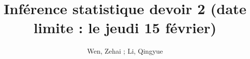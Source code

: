 \documentclass[12pt]{report}
\title{Inférence statistique devoir 2 (date limite : le jeudi 15 février)}
\author{ Wen, Zehai ; Li, Qingyue}
\date{\DTMnow}
\theoremstyle{plain}
\theoremstyle{definition}
\begin{document}
\begin{CJK*}{UTF8}{gbsn}
\maketitle 

\setcounter{tocdepth}{0}
\setcounter{page}{1}





\end{CJK*}
\end{document}
